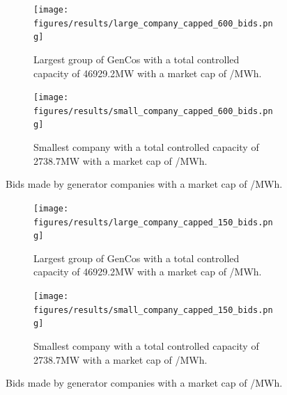 \documentclass[conference]{IEEEtran}
\providecommand{\DIFaddbeginFL}{} %
\providecommand{\DIFaddendFL}{} %
\providecommand{\DIFdelbeginFL}{} %
\providecommand{\DIFdelendFL}{} %
\newcommand{\DIFscaledelfig}{0.5}
\newlength{\DIFdelgraphicswidth} %
\newlength{\DIFdelgraphicsheight} %
\newcommand{\DIFaddincludegraphics}[2][]{{\color{blue}\fbox{\DIFOincludegraphics[#1]{#2}}}} %
\newcommand{\DIFdelincludegraphics}[2][]{%
\sbox{\DIFdelgraphicsbox}{\DIFOincludegraphics[#1]{#2}}%
\settoboxwidth{\DIFdelgraphicswidth}{\DIFdelgraphicsbox} %
\settoboxtotalheight{\DIFdelgraphicsheight}{\DIFdelgraphicsbox} %
\scalebox{\DIFscaledelfig}{%
\parbox[b]{\DIFdelgraphicswidth}{\usebox{\DIFdelgraphicsbox}\\[-\baselineskip] \rule{\DIFdelgraphicswidth}{0em}}\llap{\resizebox{\DIFdelgraphicswidth}{\DIFdelgraphicsheight}{%
\setlength{\unitlength}{\DIFdelgraphicswidth}%
\begin{picture}(1,1)%
\thicklines\linethickness{2pt} %
{\color[rgb]{1,0,0}\put(0,0){\framebox(1,1){}}}%
{\color[rgb]{1,0,0}\put(0,0){\line( 1,1){1}}}%
{\color[rgb]{1,0,0}\put(0,1){\line(1,-1){1}}}%
\end{picture}%
}\hspace*{3pt}}} %
} %
\DeclareRobustCommand{\DIFaddbeginFL}{\DIFOaddbeginFL \let\includegraphics\DIFaddincludegraphics} %
\DeclareRobustCommand{\DIFaddendFL}{\DIFOaddendFL \let\includegraphics\DIFOincludegraphics} %
\DeclareRobustCommand{\DIFdelbeginFL}{\DIFOdelbeginFL \let\includegraphics\DIFdelincludegraphics} %
\DeclareRobustCommand{\DIFdelendFL}{\DIFOaddendFL \let\includegraphics\DIFOincludegraphics} %
\begin{document}
\begin{figure}
\centering
\DIFdelbeginFL %
\DIFdelendFL \DIFaddbeginFL \begin{subfigure}[b]{0.49\textwidth}   
\DIFaddendFL \texttt{[image: figures/results/large\_company\_capped\_600\_bids.png]}
\caption{Largest group of GenCos with a total controlled capacity of 46929.2MW with a market cap of /MWh.}
\label{fig:large_company_capped_600_bids}
\end{subfigure}
\hfil
\DIFdelbeginFL %
\DIFdelendFL \DIFaddbeginFL \begin{subfigure}[b]{0.49\textwidth}   
\DIFaddendFL \texttt{[image: figures/results/small\_company\_capped\_600\_bids.png]}
\caption{Smallest company with a total controlled capacity of 2738.7MW with a market cap of /MWh.}
\label{fig:small_company_capped_600_bids}
\end{subfigure}
\caption{Bids made by generator companies with a market cap of /MWh.}
\label{fig:capped_600_bids}
\end{figure}




\begin{figure}
\centering
\DIFdelbeginFL %
\DIFdelendFL \DIFaddbeginFL \begin{subfigure}[b]{0.49\textwidth}   
\DIFaddendFL \texttt{[image: figures/results/large\_company\_capped\_150\_bids.png]}
\caption{Largest group of GenCos with a total controlled capacity of 46929.2MW with a market cap of /MWh.}
\label{fig:large_company_capped_150_bids}
\end{subfigure}
\hfil
\DIFdelbeginFL %
\DIFdelendFL \DIFaddbeginFL \begin{subfigure}[b]{0.49\textwidth}   
\DIFaddendFL \texttt{[image: figures/results/small\_company\_capped\_150\_bids.png]}
\caption{Smallest company with a total controlled capacity of 2738.7MW with a market cap of /MWh.}
\label{fig:small_company_capped_150_bids}
\end{subfigure}
\caption{Bids made by generator companies with a market cap of /MWh.}
\label{fig:capped_150_bids}
\end{figure}
\end{document}
